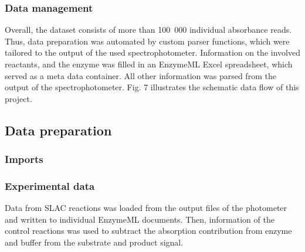 \documentclass[letterpaper,12pt,english]{jupyterBook}
\begin{document}
\subsubsection{Data management}
\label{\detokenize{scenarios/SLAC_kinetic_characterization:data-management}}
\sphinxAtStartPar
Overall, the dataset consists of more than 100 000 individual absorbance reads. Thus, data preparation was automated by custom parser functions, which were tailored to the output of the used spectrophotometer. Information on the involved reactants, and the enzyme was filled in an EnzymeML Excel spreadsheet, which served as a meta data container. All other information was parsed from the output of the spectrophotometer. Fig. 7 illustrates the schematic data flow of this project.

\sphinxAtStartPar
{}


\subsection{Data preparation}
\label{\detokenize{scenarios/SLAC_kinetic_characterization:data-preparation}}

\subsubsection{Imports}
\label{\detokenize{scenarios/SLAC_kinetic_characterization:imports}}

\subsubsection{Experimental data}
\label{\detokenize{scenarios/SLAC_kinetic_characterization:experimental-data}}
\sphinxAtStartPar
Data from SLAC reactions was loaded from the output files of the photometer and written to individual EnzymeML documents. Then, information of the control reactions was used to subtract the absorption contribution from enzyme and buffer from the substrate and product signal.
\end{document}
